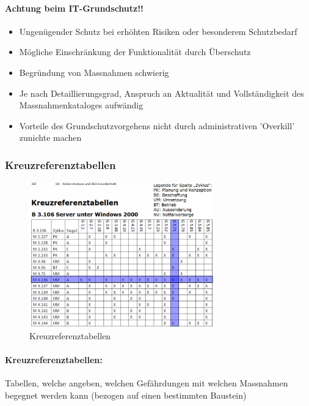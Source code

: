 \documentclass[10pt,a4paper]{article}
\begin{document}
\paragraph*{Achtung beim IT-Grundschutz!!}
\begin{itemize}[noitemsep,topsep=0pt,leftmargin=*]
    \item Ungenügender Schutz bei erhöhten Risiken
    oder besonderem Schutzbedarf
    \item Mögliche Einschränkung der Funktionalität
    durch Überschutz
    \item Begründung von Massnahmen schwierig
    \item Je nach Detaillierungsgrad, Anspruch an
    Aktualität und Vollständigkeit des
    Massnahmenkataloges aufwändig
    \item Vorteile des Grundschutzvorgehens nicht
    durch administrativen 'Overkill' zunichte
    machen
\end{itemize}

\subsubsection*{Kreuzreferenztabellen}
\begin{figure}[H]
    \begin{center}
    \includegraphics[width=8cm]{images/Kreuzreferenztabellen.png}
    \caption{Kreuzreferenztabellen}
    \label{Kreuzreferenztabellen}
    \end{center}
\end{figure}

\paragraph*{Kreuzreferenztabellen:}Tabellen, welche angeben, welchen Gefährdungen mit welchen Massnahmen begegnet werden kann (bezogen auf einen bestimmten Baustein)
\end{document}
